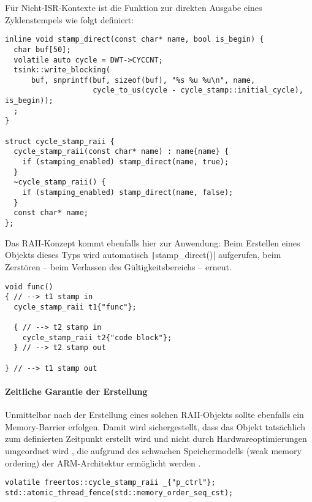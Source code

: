 Für Nicht-ISR-Kontexte ist die Funktion zur direkten Ausgabe eines
Zyklenstempels wie folgt definiert:

\begin{code}
\begin{verbatim}
inline void stamp_direct(const char* name, bool is_begin) {
  char buf[50];
  volatile auto cycle = DWT->CYCCNT;
  tsink::write_blocking(
      buf, snprintf(buf, sizeof(buf), "%s %u %u\n", name,
                    cycle_to_us(cycle - cycle_stamp::initial_cycle), is_begin));
  ;
}

struct cycle_stamp_raii {
  cycle_stamp_raii(const char* name) : name{name} {
    if (stamping_enabled) stamp_direct(name, true);
  }
  ~cycle_stamp_raii() {
    if (stamping_enabled) stamp_direct(name, false);
  }
  const char* name;
};
\end{verbatim}
\end{code}

Das RAII-Konzept kommt ebenfalls hier zur Anwendung: Beim Erstellen eines
Objekts dieses Typs wird automatisch \texttt|stamp_direct()|
aufgerufen, beim Zerstören -- beim Verlassen des Gültigkeitsbereichs -- erneut.

\begin{code}
\begin{verbatim}
void func()
{ // --> t1 stamp in
  cycle_stamp_raii t1{"func"};

  { // --> t2 stamp in
    cycle_stamp_raii t2{"code block"};
  } // --> t2 stamp out

} // --> t1 stamp out
\end{verbatim}
\end{code}

\paragraph{Zeitliche Garantie der Erstellung}

Unmittelbar nach der Erstellung eines solchen RAII-Objekts sollte ebenfalls ein
Memory-Barrier erfolgen. Damit wird sichergestellt, dass das Objekt tatsächlich
zum definierten Zeitpunkt erstellt wird und nicht durch Hardwareoptimierungen
umgeordnet wird \cite{wikipedia_membarrier}, die aufgrund des schwachen
Speichermodells (weak memory ordering) der ARM-Architektur ermöglicht werden
\cite[S. 5]{arm_sync_overview}.

\begin{code}
\begin{verbatim}
volatile freertos::cycle_stamp_raii _{"p_ctrl"};
std::atomic_thread_fence(std::memory_order_seq_cst);
\end{verbatim}
\end{code}

